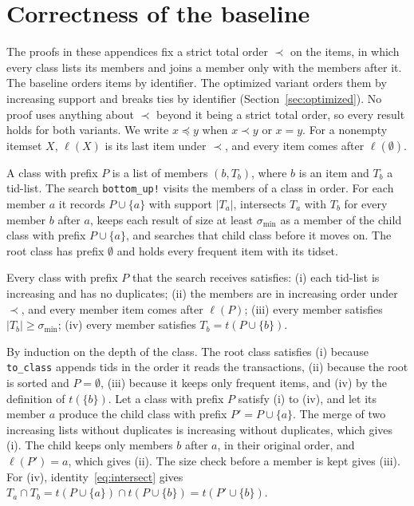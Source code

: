 \appendices

\section{Correctness of the baseline}
\label{app:baseline}
The proofs in these appendices fix a strict total order $\prec$ on the items, in which
every class lists its members and joins a member only with the members after it. The
baseline orders items by identifier. The optimized variant orders them by increasing
support and breaks ties by identifier (Section~\ref{sec:optimized}). No proof uses
anything about $\prec$ beyond it being a strict total order, so every result holds for
both variants. We write $x \preceq y$ when $x \prec y$ or $x = y$. For a nonempty itemset
$X$, $\ell(X)$ is its last item under $\prec$, and every item comes after
$\ell(\emptyset)$.

A class with prefix $P$ is a list of members $(b, T_b)$, where $b$ is an item and $T_b$ a
tid-list. The search \texttt{bottom\_up!} visits the members of a class in order. For each
member $a$ it records $P \cup \{a\}$ with support $|T_a|$, intersects $T_a$ with $T_b$ for
every member $b$ after $a$, keeps each result of size at least $\sigma_{\min}$ as a
member of the child class with prefix $P \cup \{a\}$, and searches that child class before
it moves on. The root class has prefix $\emptyset$ and holds every frequent item with its
tidset.

\begin{lemma}[Invariants]
\label{lem:invariants}
Every class with prefix $P$ that the search receives satisfies: (i) each tid-list is
increasing and has no duplicates; (ii) the members are in increasing order under $\prec$,
and every member item comes after $\ell(P)$; (iii) every member satisfies
$|T_b| \ge \sigma_{\min}$; (iv) every member satisfies $T_b = t(P \cup \{b\})$.
\end{lemma}
\begin{IEEEproof}
By induction on the depth of the class. The root class satisfies (i) because
\texttt{to\_class} appends tids in the order it reads the transactions, (ii) because the
root is sorted and $P = \emptyset$, (iii) because it keeps only frequent items, and (iv)
by the definition of $t(\{b\})$. Let a class with prefix $P$ satisfy (i) to (iv), and let
its member $a$ produce the child class with prefix $P' = P \cup \{a\}$. The merge of two
increasing lists without duplicates is increasing without duplicates, which gives (i).
The child keeps only members $b$ after $a$, in their original order, and $\ell(P') = a$,
which gives (ii). The size check before a member is kept gives (iii). For (iv),
identity~\eqref{eq:intersect} gives
$T_a \cap T_b = t(P \cup \{a\}) \cap t(P \cup \{b\}) = t(P' \cup \{b\})$.
\end{IEEEproof}

